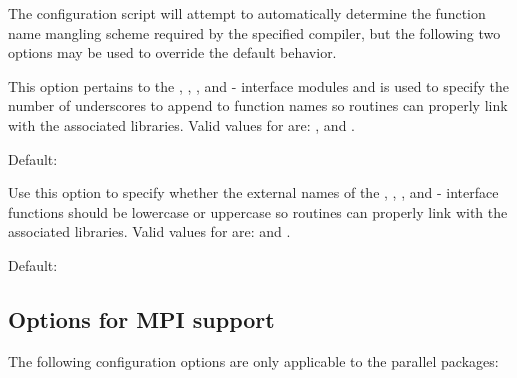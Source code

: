 \noindent The configuration script will attempt to automatically determine the
function name mangling scheme required by the specified {\F} compiler, but the
following two options may be used to override the default behavior.

\begin{config}

\item {}

  This option pertains to the {\fcvode}, {\fkinsol}, {\fida}, and {\fnvector}
  {\F}-{\C} interface modules and is used to specify the number of underscores to
  append to function names so {\F} routines can properly link with the associated
  {\sundials} libraries. Valid values for  are: , 
  and .

  Default: 

\item {}

  Use this option to specify whether the external names of the {\fcvode},
  {\fkinsol}, {\fida}, and {\fnvector} {\F}-{\C} interface functions should be
  lowercase or uppercase so {\F} routines can properly link with the associated
  {\sundials} libraries. Valid values for  are:  and .

  Default: 

\end{config}



\subsection*{Options for MPI support}

\noindent The following configuration options are only applicable to the parallel
{\sundials} packages:

